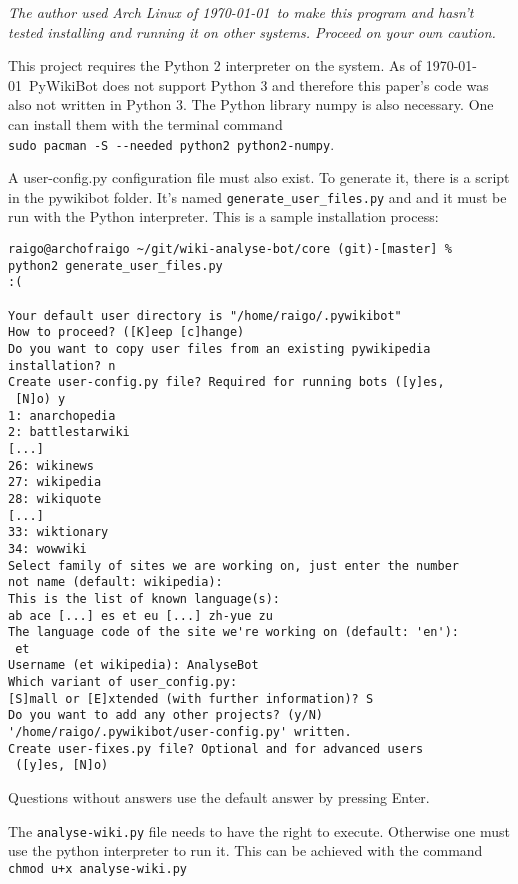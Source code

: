 \emph{The author used Arch Linux of \today\ to make this program and hasn't
tested installing and running it on other systems. Proceed on your own caution.}

This project requires the Python 2 interpreter on the system. As of \today\
PyWikiBot does not support Python 3 and therefore this paper's code was also not
written in Python 3. The Python library numpy is also necessary.
One can install them with the terminal command \\
\verb;sudo pacman -S --needed python2 python2-numpy;.

A user-config.py configuration file must also exist. To generate it, there is a
script in the pywikibot folder. It's named \verb;generate_user_files.py; and and
it must be run with the Python interpreter. This is a sample installation
process:
\begin{verbatim}
raigo@archofraigo ~/git/wiki-analyse-bot/core (git)-[master] % 
python2 generate_user_files.py                                                                               :(

Your default user directory is "/home/raigo/.pywikibot"
How to proceed? ([K]eep [c]hange) 
Do you want to copy user files from an existing pywikipedia 
installation? n
Create user-config.py file? Required for running bots ([y]es,
 [N]o) y
1: anarchopedia
2: battlestarwiki
[...]
26: wikinews
27: wikipedia
28: wikiquote
[...]
33: wiktionary
34: wowwiki
Select family of sites we are working on, just enter the number 
not name (default: wikipedia): 
This is the list of known language(s):
ab ace [...] es et eu [...] zh-yue zu
The language code of the site we're working on (default: 'en'):
 et
Username (et wikipedia): AnalyseBot
Which variant of user_config.py:
[S]mall or [E]xtended (with further information)? S
Do you want to add any other projects? (y/N)
'/home/raigo/.pywikibot/user-config.py' written.
Create user-fixes.py file? Optional and for advanced users
 ([y]es, [N]o) 
\end{verbatim}
Questions without answers use the default answer by pressing Enter.

The \verb;analyse-wiki.py; file needs to have the right to execute. Otherwise
one must use the python interpreter to run it. This can be achieved with the
command \verb;chmod u+x analyse-wiki.py;
